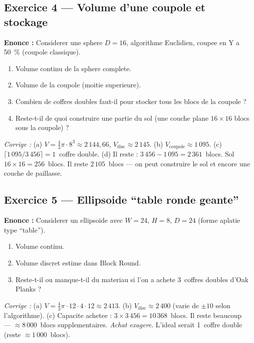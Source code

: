 \documentclass[12pt,a4paper]{scrartcl}
\begin{document}
\subsection*{Exercice 4 --- Volume d'une coupole et stockage}
\textbf{Enonce :} Considerer une sphere $D = 16$, algorithme Euclidien, coupee en Y a 50~\% (coupole classique).
\begin{enumerate}[label=\alph*),leftmargin=1.5em,itemsep=0.1em,topsep=0.2em,nosep]
  \item Volume continu de la sphere complete.
  \item Volume de la coupole (moitie superieure).
  \item Combien de coffres doubles faut-il pour stocker tous les blocs de la coupole ?
  \item Reste-t-il de quoi construire une partie du sol (une couche plane $16 \times 16$ blocs sous la coupole) ?
\end{enumerate}

\emph{Corrige :}
(a) $V = \tfrac{4}{3}\pi \cdot 8^3 \approx 2\,144{,}66$, $V_{\mathrm{disc}} \approx 2\,145$. (b) $V_{\mathrm{coupole}} \approx 1\,095$. (c) $\lceil 1\,095 / 3\,456 \rceil = 1$~coffre double. (d) Il reste : $3\,456 - 1\,095 = 2\,361$~blocs. Sol $16 \times 16 = 256$~blocs. Il reste $2\,105$~blocs --- on peut construire le sol et encore une couche de paillasse.

\subsection*{Exercice 5 --- Ellipsoide \enquote{table ronde geante}}
\textbf{Enonce :} Considerer un ellipsoide avec $W = 24$, $H = 8$, $D = 24$ (forme aplatie type \enquote{table}).
\begin{enumerate}[label=\alph*),leftmargin=1.5em,itemsep=0.1em,topsep=0.2em,nosep]
  \item Volume continu.
  \item Volume discret estime dans Block Round.
  \item Reste-t-il ou manque-t-il du materiau si l'on a achete 3~coffres doubles d'Oak Planks ?
\end{enumerate}

\emph{Corrige :}
(a) $V = \tfrac{4}{3}\pi \cdot 12 \cdot 4 \cdot 12 \approx 2\,413$.
(b) $V_{\mathrm{disc}} \approx 2\,400$ (varie de $\pm 10$ selon l'algorithme).
(c) Capacite achetee : $3 \times 3\,456 = 10\,368$~blocs. Il reste beaucoup --- $\approx 8\,000$~blocs supplementaires. \emph{Achat exagere.} L'ideal serait 1~coffre double (reste $\approx 1\,000$~blocs).
\end{document}

